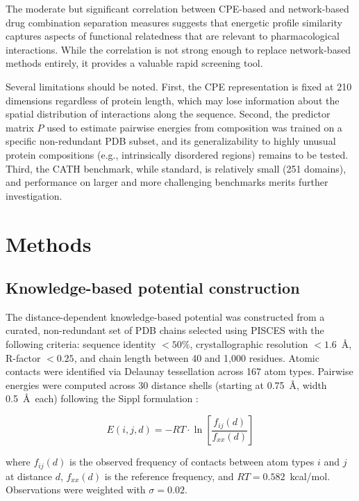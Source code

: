 \documentclass[11pt]{article}
\begin{document}
The moderate but significant correlation between CPE-based and network-based drug combination separation measures suggests that energetic profile similarity captures aspects of functional relatedness that are relevant to pharmacological interactions. While the correlation is not strong enough to replace network-based methods entirely, it provides a valuable rapid screening tool.

Several limitations should be noted. First, the CPE representation is fixed at 210 dimensions regardless of protein length, which may lose information about the spatial distribution of interactions along the sequence. Second, the predictor matrix $P$ used to estimate pairwise energies from composition was trained on a specific non-redundant PDB subset, and its generalizability to highly unusual protein compositions (e.g., intrinsically disordered regions) remains to be tested. Third, the CATH benchmark, while standard, is relatively small (251 domains), and performance on larger and more challenging benchmarks merits further investigation.

\section{Methods}

\subsection{Knowledge-based potential construction}

The distance-dependent knowledge-based potential was constructed from a curated, non-redundant set of PDB chains \citep{berman2000} selected using PISCES \citep{wang2004} with the following criteria: sequence identity $< 50\%$, crystallographic resolution $< 1.6$~\AA, R-factor $< 0.25$, and chain length between 40 and 1{,}000 residues. Atomic contacts were identified via Delaunay tessellation \citep{delaunay1934} across 167 atom types. Pairwise energies were computed across 30 distance shells (starting at 0.75~\AA, width 0.5~\AA\ each) following the Sippl formulation \citep{sippl1990}:

\begin{equation}
E(i,j,d) = -RT \cdot \ln\left[\frac{f_{ij}(d)}{f_{xx}(d)}\right]
\end{equation}

\noindent where $f_{ij}(d)$ is the observed frequency of contacts between atom types $i$ and $j$ at distance $d$, $f_{xx}(d)$ is the reference frequency, and $RT = 0.582$~kcal/mol. Observations were weighted with $\sigma = 0.02$.
\end{document}
